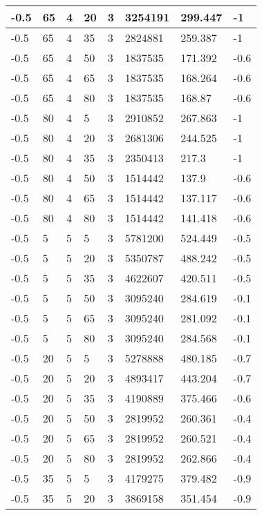 \begin{longtable}{|p{1.4cm}|p{1.4cm}|p{1.4cm}|p{1.4cm}|p{1.4cm}|p{1.4cm}|p{1.4cm}|p{1.5cm}|}
        -0.5 & 65 & 4 & 20 & 3 & 3254191 & 299.447 & -1 \\ \hline
        -0.5 & 65 & 4 & 35 & 3 & 2824881 & 259.387 & -1 \\ \hline
        -0.5 & 65 & 4 & 50 & 3 & 1837535 & 171.392 & -0.6 \\ \hline
        -0.5 & 65 & 4 & 65 & 3 & 1837535 & 168.264 & -0.6 \\ \hline
        -0.5 & 65 & 4 & 80 & 3 & 1837535 & 168.87 & -0.6 \\ \hline
        -0.5 & 80 & 4 & 5 & 3 & 2910852 & 267.863 & -1 \\ \hline
        -0.5 & 80 & 4 & 20 & 3 & 2681306 & 244.525 & -1 \\ \hline
        -0.5 & 80 & 4 & 35 & 3 & 2350413 & 217.3 & -1 \\ \hline
        -0.5 & 80 & 4 & 50 & 3 & 1514442 & 137.9 & -0.6 \\ \hline
        -0.5 & 80 & 4 & 65 & 3 & 1514442 & 137.117 & -0.6 \\ \hline
        -0.5 & 80 & 4 & 80 & 3 & 1514442 & 141.418 & -0.6 \\ \hline
        -0.5 & 5 & 5 & 5 & 3 & 5781200 & 524.449 & -0.5 \\ \hline
        -0.5 & 5 & 5 & 20 & 3 & 5350787 & 488.242 & -0.5 \\ \hline
        -0.5 & 5 & 5 & 35 & 3 & 4622607 & 420.511 & -0.5 \\ \hline
        -0.5 & 5 & 5 & 50 & 3 & 3095240 & 284.619 & -0.1 \\ \hline
        -0.5 & 5 & 5 & 65 & 3 & 3095240 & 281.092 & -0.1 \\ \hline
        -0.5 & 5 & 5 & 80 & 3 & 3095240 & 284.568 & -0.1 \\ \hline
        -0.5 & 20 & 5 & 5 & 3 & 5278888 & 480.185 & -0.7 \\ \hline
        -0.5 & 20 & 5 & 20 & 3 & 4893417 & 443.204 & -0.7 \\ \hline
        -0.5 & 20 & 5 & 35 & 3 & 4190889 & 375.466 & -0.6 \\ \hline
        -0.5 & 20 & 5 & 50 & 3 & 2819952 & 260.361 & -0.4 \\ \hline
        -0.5 & 20 & 5 & 65 & 3 & 2819952 & 260.521 & -0.4 \\ \hline
        -0.5 & 20 & 5 & 80 & 3 & 2819952 & 262.866 & -0.4 \\ \hline
        -0.5 & 35 & 5 & 5 & 3 & 4179275 & 379.482 & -0.9 \\ \hline
        -0.5 & 35 & 5 & 20 & 3 & 3869158 & 351.454 & -0.9 \\ \hline

\end{longtable}
